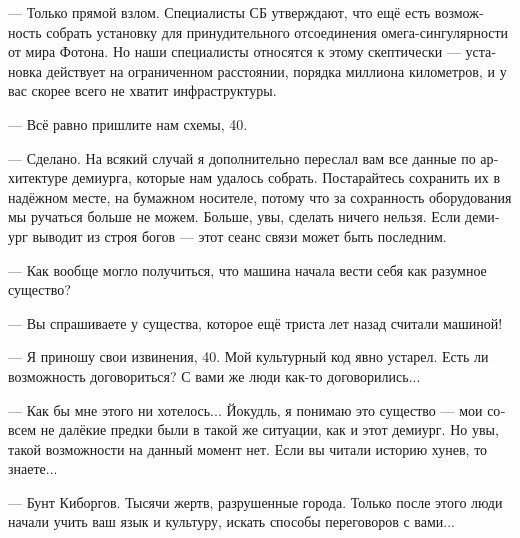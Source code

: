 \documentclass[a4paper,12pt,fleqn]{book}\usepackage{polyglossia}\setdefaultlanguage[babelshorthands=true]{russian}\setotherlanguage{english}\defaultfontfeatures{Ligatures=TeX,Mapping=tex-text}\usepackage{xcolor}\newcommand{\ml}[3]{#2}
\begin{document}
\ml{$0$}
{--- Только прямой взлом.}
{``Your only option is to hack that thing.}
\ml{$0$}
{Специалисты СБ утверждают, что ещё есть возможность собрать установку для принудительного отсоединения омега-сингулярности от мира Фотона.}
{SSC specialists say that you have the opportunity to assembly a machine which can sever the connection between omega singularity and Photon Universe.}
\ml{$0$}
{Но наши специалисты относятся к этому скептически --- установка действует на ограниченном расстоянии, порядка миллиона километров, и у вас скорее всего не хватит инфраструктуры.}
{But our specialists are skeptical, because the machine has limited range, about one million kilometers, and most likely your infrastructure is insufficient.''}

\ml{$0$}
{--- Всё равно пришлите нам схемы, 40.}
{``Send us the blueprints anyway, 40.''}

\ml{$0$}
{--- Сделано.}
{``It's done.}
\ml{$0$}
{На всякий случай я дополнительно переслал вам все данные по архитектуре демиурга, которые нам удалось собрать.}
{Just in case, I send you all the data on the demiurge architecture we could collect.}
Постарайтесь сохранить их в надёжном месте, на бумажном носителе, потому что за сохранность оборудования мы ручаться больше не можем.
\ml{$0$}
{Больше, увы, сделать ничего нельзя.}
{And, I'm afraid, we've run out of options.}
Если демиург выводит из строя богов --- этот сеанс связи может быть последним.

\ml{$0$}
{--- Как вообще могло получиться, что машина начала вести себя как разумное существо?}
{``How is it possible that a machine started act like a sapient?''}

\ml{$0$}
{--- Вы спрашиваете у существа, которое ещё триста лет назад считали машиной!}
{``You're asking a specimen of sapients which were treated as machines just three hundred years ago!''}

--- Я приношу свои извинения, 40.
\ml{$0$}
{Мой культурный код явно устарел.}
{My culture background is obviously outdated.}
Есть ли возможность договориться?
С вами же люди как-то договорились...

--- Как бы мне этого ни хотелось...
Йокудль, я понимаю это существо --- мои совсем не далёкие предки были в такой же ситуации, как и этот демиург.
Но увы, такой возможности на данный момент нет.
Если вы читали историю хунев, то знаете...

--- Бунт Киборгов.
Тысячи жертв, разрушенные города.
Только после этого люди начали учить ваш язык и культуру, искать способы переговоров с вами...
\end{document}
